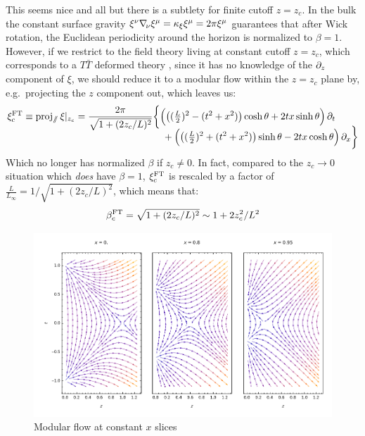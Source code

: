 \documentclass[11pt,a4paper]{article}
\newcommand{\TTbar}{\ensuremath{T\bar{T}}\xspace}
\begin{document}
	This seems nice and all but there is a subtlety for finite cutoff $z = z_c$. 
	In the bulk the constant surface gravity $
		\xi^\nu \nabla_{\!\mathnormal{\nu}} \xi^\mu
		= \kappa_\xi \xi^\mu
		= 2\pi \xi^\mu
	$ guarantees that after Wick rotation, the Euclidean periodicity around the horizon is normalized to $\beta = 1$. However, if we restrict to the field theory living at constant cutoff $z = z_c$, which corresponds to a \TTbar deformed theory \cite{McGough:2016lol,Lewkowycz:2019xse} , since it has no knowledge of the $\partial_{z}$ component of $\xi$, we should reduce it to a modular flow within the $z = z_c$ plane by, e.g.~projecting the $z$ component out, which leaves us:
	\begin{equation}
	\begin{aligned}
		\xi^{\mrm{FT}}_c
		\equiv \proj{\sslash} \xi|_{z_c}
		= \frac{2\pi}{
				\sqrt{1 + (2z_c/L)^2}
			}
		& \bigg\{
			\pqty\Big{
				\pqty{
					(\tfrac{L}{2})^2
					- (t^2 + x^2)
				} \cosh\theta
				+ 2tx \sinh\theta
			} \,\pdd{t}
		\\[-2ex] &\quad 
			+ \pqty\Big{
				\pqty{
					(\tfrac{L}{2})^2
					+ (t^2 + x^2)
				} \sinh\theta
				- 2tx \cosh\theta
			} \,\pdd{x}
		\bigg\}
	\end{aligned}
	\end{equation}
	Which no longer has normalized $\beta$ if $z_c \ne 0$. In fact, compared to the $z_c \to 0$ situation which \textit{does} have $\beta = 1$, $\xi^{\mathrm{FT}}_c$ is rescaled by a factor of $
		\frac{L}{L_\infty}
		= 1/\sqrt{1 + (2z_c/L)^2}
	$, which means that:
	\begin{equation}
		\beta^{\mathrm{FT}}_c
		= \sqrt{1 + (2z_c/L)^2}
		\sim 1 + 2z_c^2 / L^2
	\end{equation}
	
	\begin{figure}[!ht]
	\vspace{-1.5ex}
	\centering
	\includegraphics[width=.8\linewidth]{img/modFlowXsection.pdf}
	\hspace{2em}
	\vspace{-2ex}
	\caption{Modular flow at constant $x$ slices}
	\end{figure}
	
\end{document}
